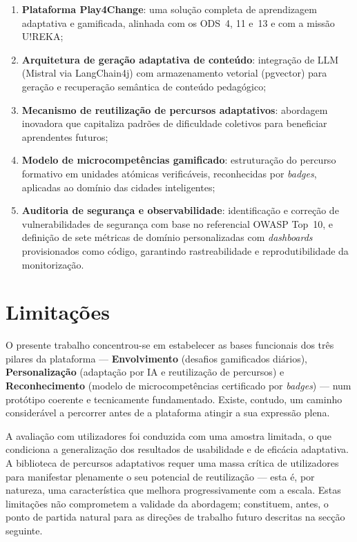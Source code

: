 \begin{enumerate}
  \item \textbf{Plataforma Play4Change}: uma solução completa de aprendizagem adaptativa e gamificada, alinhada com os ODS~4, 11 e~13 e com a missão U!REKA;
  \item \textbf{Arquitetura de geração adaptativa de conteúdo}: integração de LLM (Mistral via LangChain4j) com armazenamento vetorial (pgvector) para geração e recuperação semântica de conteúdo pedagógico;
  \item \textbf{Mecanismo de reutilização de percursos adaptativos}: abordagem inovadora que capitaliza padrões de dificuldade coletivos para beneficiar aprendentes futuros;
  \item \textbf{Modelo de microcompetências gamificado}: estruturação do percurso formativo em unidades atómicas verificáveis, reconhecidas por \textit{badges}, aplicadas ao domínio das cidades inteligentes;
  \item \textbf{Auditoria de segurança e observabilidade}: identificação e correção de vulnerabilidades de segurança com base no referencial OWASP Top~10, e definição de sete métricas de domínio personalizadas com \textit{dashboards} provisionados como código, garantindo rastreabilidade e reprodutibilidade da monitorização.
\end{enumerate}

\section{Limitações}
\label{sec:limitacoes}

O presente trabalho concentrou-se em estabelecer as bases funcionais dos três pilares da plataforma --- \textbf{Envolvimento} (desafios gamificados diários), \textbf{Personalização} (adaptação por IA e reutilização de percursos) e \textbf{Reconhecimento} (modelo de microcompetências certificado por \textit{badges}) --- num protótipo coerente e tecnicamente fundamentado. Existe, contudo, um caminho considerável a percorrer antes de a plataforma atingir a sua expressão plena.

A avaliação com utilizadores foi conduzida com uma amostra limitada, o que condiciona a generalização dos resultados de usabilidade e de eficácia adaptativa. A biblioteca de percursos adaptativos requer uma massa crítica de utilizadores para manifestar plenamente o seu potencial de reutilização --- esta é, por natureza, uma característica que melhora progressivamente com a escala.
Estas limitações não comprometem a validade da abordagem; constituem, antes, o ponto de partida natural para as direções de trabalho futuro descritas na secção seguinte.

